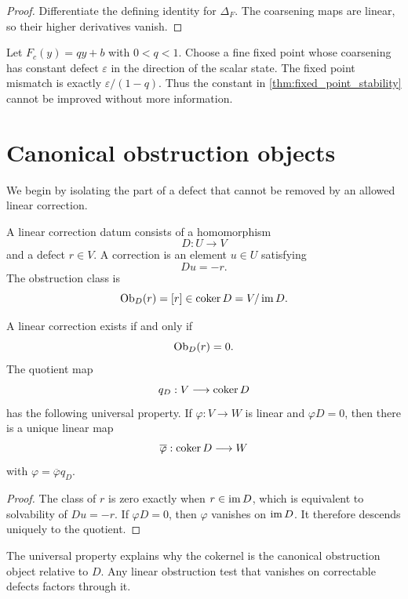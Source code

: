 \begin{proof}
Differentiate the defining identity for $\Delta_F$.  The coarsening maps are linear, so their higher derivatives vanish.
\end{proof}

\begin{example}\label{ex:sharp_affine_bound}
Let $F_c(y)=qy+b$ with $0<q<1$.  Choose a fine fixed point whose coarsening has constant defect $\varepsilon$ in the direction of the scalar state.  The fixed point mismatch is exactly $\varepsilon/(1-q)$.  Thus the constant in \cref{thm:fixed_point_stability} cannot be improved without more information.
\end{example}

\section{Canonical obstruction objects}\label{sec:obstruction_objects}

We begin by isolating the part of a defect that cannot be removed by an allowed linear correction.

\begin{definition}\label{def:linear_correction_datum}
A linear correction datum consists of a homomorphism
\[
D:U\longrightarrow V
\]
and a defect $r\in V$.  A correction is an element $u\in U$ satisfying
\[
Du=-r.
\]
The obstruction class is
\[
\operatorname{Ob}_D(r)=[r]\in\operatorname{coker} D=V/\operatorname{im} D.
\]
\end{definition}

\begin{theorem}\label{thm:cokernel_obstruction}
A linear correction exists if and only if
\[
\operatorname{Ob}_D(r)=0.
\]
The quotient map
\[
q_D:V\longrightarrow\operatorname{coker} D
\]
has the following universal property.  If $\varphi:V\to W$ is linear and $\varphi D=0$, then there is a unique linear map
\[
\overline\varphi:\operatorname{coker} D\longrightarrow W
\]
with $\varphi=\overline\varphi q_D$.
\end{theorem}

\begin{proof}
The class of $r$ is zero exactly when $r\in\operatorname{im} D$, which is equivalent to solvability of $Du=-r$.  If $\varphi D=0$, then $\varphi$ vanishes on $\operatorname{im} D$.  It therefore descends uniquely to the quotient.
\end{proof}

The universal property explains why the cokernel is the canonical obstruction object relative to $D$.  Any linear obstruction test that vanishes on correctable defects factors through it.

